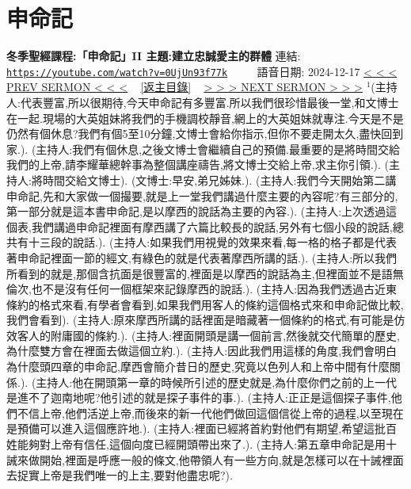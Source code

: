 \documentclass{book}
\begin{document}
\section{申命記}
\label{sec:0UjUn93f77k}
\textbf{冬季聖經課程:「申命記」II 主題:建立忠誠愛主的群體}
\newline
\newline
連結: \href{https://youtube.com/watch?v=0UjUn93f77k}{\texttt{https://youtube.com/watch?v=0UjUn93f77k}} ~~~~ 語音日期: 2024-12-17
\newline
\newline
\hyperref[sec:m_AdQi66HCM]{\small{< < < PREV SERMON < < <}}
~
\hyperref[sec:index]{\small{[返主目錄]}}
~
\hyperref[sec:VhiGoXEG1RY]{\small{> > > NEXT SERMON > > >}}
\newline
\newline
$^{1}$(主持人:代表豐富,所以很期待,今天申命記有多豐富.所以我們很珍惜最後一堂,和文博士在一起.現場的大英姐妹將我們的手機調校靜音,網上的大英姐妹就專注.今天是不是仍然有個休息?我們有個5至10分鐘,文博士會給你指示,但你不要走開太久,盡快回到家.).
(主持人:我們有個休息,之後文博士會繼續自己的預備.最重要的是將時間交給我們的上帝,請李耀華總幹事為整個講座禱告,將文博士交給上帝,求主你引領.).
(主持人:將時間交給文博士).
(文博士:早安,弟兄姊妹.).
(主持人:我們今天開始第二講申命記,先和大家做一個撮要,就是上一堂我們講過什麼主要的內容呢?有三部分的,第一部分就是這本書申命記,是以摩西的說話為主要的內容.).
(主持人:上次透過這個表,我們講過申命記裡面有摩西講了六篇比較長的說話,另外有七個小段的說話,總共有十三段的說話.).
(主持人:如果我們用視覺的效果來看,每一格的格子都是代表著申命記裡面一節的經文,有綠色的就是代表著摩西所講的話.).
(主持人:所以我們所看到的就是,那個含抗面是很豐富的,裡面是以摩西的說話為主,但裡面並不是語無倫次,也不是沒有任何一個框架來記錄摩西的說話.).
(主持人:因為我們透過古近東條約的格式來看,有學者會看到,如果我們用客人的條約這個格式來和申命記做比較,我們會看到).
(主持人:原來摩西所講的話裡面是暗藏著一個條約的格式,有可能是仿效客人的附庸國的條約.).
(主持人:裡面開頭是講一個前言,然後就交代簡單的歷史,為什麼雙方會在裡面去做這個立約.).
(主持人:因此我們用這樣的角度,我們會明白為什麼頭四章的申命記,摩西會簡介昔日的歷史,究竟以色列人和上帝中間有什麼關係.).
(主持人:他在開頭第一章的時候所引述的歷史就是,為什麼你們之前的上一代是進不了迦南地呢?他引述的就是探子事件的事.).
(主持人:正正是這個探子事件,他們不信上帝,他們活逆上帝,而後來的新一代他們做回這個信從上帝的過程,以至現在是預備可以進入這個應許地.).
(主持人:裡面已經將首約對他們有期望,希望這批百姓能夠對上帝有信任,這個向度已經開頭帶出來了.).
(主持人:第五章申命記是用十誡來做開始,裡面是呼應一般的條文,他帶領人有一些方向,就是怎樣可以在十誡裡面去捉實上帝是我們唯一的上主,要對他盡忠呢?).
\end{document}
